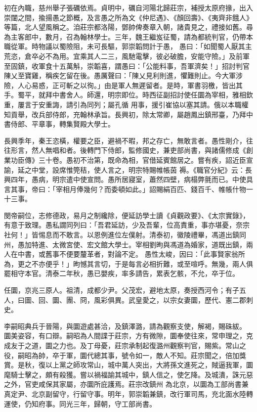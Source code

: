 \begin{pinyinscope}
 初在內職，慈州舉子張礪依焉。貞明中，礪自河陽北歸莊宗，補授太原府掾，出入崇闥之間，揄揚愚之節概，及言愚之所為文《仲尼遇》、《顏回壽》、《夷齊非餓人》等篇，北人望風稱之。洎莊宗都洛陽，鄧帥俾奏章入朝，諸貴見之，禮接如舊。尋為主客郎中，數月，召為翰林學士。三年，魏王繼岌征蜀，請為都統判官，仍帶本職從軍。時物議以蜀險阻，未可長驅，郭崇韜問計于愚，
 愚曰：「如聞蜀人厭其主荒恣，倉卒必不為用。宜乘其人二三，風馳電擊，彼必破膽，安能守險。」及前軍至固鎮，收軍食十五萬斛，崇韜喜，謂愚曰：「公能料事，吾軍濟矣！」招討判官陳乂至寶雞，稱疾乞留在後。愚厲聲曰：「陳乂見利則進，懼難則止。今大軍涉險，人心易惑，正可斬之以徇。」由是軍人無遲留者。是時，軍書羽檄，皆出其手。蜀平，就拜中書舍人。師還，明宗即位。時西征副招討使任圜為宰相，雅相欽重，屢言于安重誨，請引為同列；屬孔循
 用事，援引崔協以塞其請。俄以本職權知貢舉，改兵部侍郎，充翰林承旨。長興初，除太常卿，屬趙鳳出鎮邢臺，乃拜中書侍郎、平章事，轉集賢殿大學士。



 長興季年，秦王恣橫，權要之臣，避禍不暇，邦之存亡，無敢言者。愚性剛介，往往形言，然人無唱和者。後轉門下侍郎，監修國史，兼吏部尚書，與諸儒修成《創業功臣傳》三十卷。愚初不治第，既命為相，官借延賓館居之。嘗有疾，詔近臣宣諭，延之中堂，設席惟筦秸，使人言之，明宗特賜帷帳茵
 褥。《職官分紀》云：長興四年，愚病，明宗遣中使宣問。愚所居寢室，蕭然四壁，病榻弊氈而已。中使具言其事，帝曰：「宰相月俸幾何？而委頓如此。」詔賜絹百匹、錢百千、帷帳什物一十三事。



 閔帝嗣位，志修德政，易月之制纔除，便延訪學士讀《貞觀政要》、《太宗實錄》，有意于致理。愚私謂同列曰：「吾君延訪，少及吾輩，位高責重，事亦堪憂，奈宗社何！」皆惕息而不敢言。以恩例進位左僕射。清泰初，徽陵禮畢，馮道出鎮同州，愚加特進、太微宮使、宏文館大學士。宰相劉昫與馮道為婚家，道既出鎮，兩人在中書，或舊事不便要釐革者，對論不定。
 愚性太峻，因曰：「此事賢家翁所為，更之不亦便乎！」昫憾其言切，于是每言必相折難，或至喧呼。無幾，兩人俱罷相守本官。清泰二年秋，愚已嬰疾，率多請告，累表乞骸，不允，卒于位。



 任圜，京兆三原人。祖清，成都少尹。父茂宏，避地太原，奏授西河令；有子五人，曰圖、回、圜、團、冏，風彩俱異。武皇愛之，以宗女妻圜，歷代、憲二郡刺史。



 李嗣昭典兵于晉陽，與圜遊處甚洽，及鎮澤潞，請為觀察支使，解褐，賜硃紱。
 圜美姿容，有口辯。嗣昭為人間諜于莊宗，方有微隙，圜奉使往來，常申理之，克成友于之道，圜之力也。及丁母憂，莊宗承制起復潞州觀察判官，賜紫。常山之役，嗣昭為帥，卒于軍，圜代總其事，號令如一，敵人不知。莊宗聞之，倍加獎賞。是秋，復以上黨之師攻常山，城中萬人突出，大將孫文進死之，賊逼我軍，圜麾騎士擊之，頗有殺獲。嘗以禍福諭其城中，鎮人信之，使乞降。及城潰，誅元惡之外，官吏咸保其家屬，亦圜所庇護焉。莊宗改鎮州
 為北京，以圜為工部尚書兼真定尹、北京副留守，行留守事。明年，郭崇韜兼鎮，改行軍司馬，充北面水陸轉運使，仍知府事。同光三年，歸朝，守工部尚書。




\end{pinyinscope}
